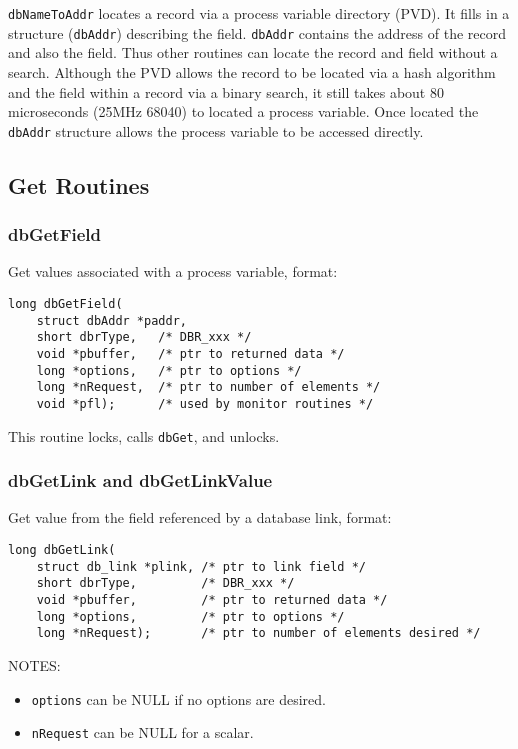 \verb|dbNameToAddr| locates a record via a process variable directory (PVD). It fills in a structure (\verb|dbAddr|) describing the 
field. \verb|dbAddr| contains the address of the record and also the field. Thus other routines can locate the record and field 
without a search. Although the PVD allows the record to be located via a hash algorithm and the field within a record via 
a binary search, it still takes about 80 microseconds (25MHz 68040) to located a process variable. Once located the 
\verb|dbAddr| structure allows the process variable to be accessed directly.

\subsection{Get Routines}

\subsubsection{dbGetField}

Get values associated with a process variable, format:

\begin{verbatim}
long dbGetField(
    struct dbAddr *paddr,
    short dbrType,   /* DBR_xxx */
    void *pbuffer,   /* ptr to returned data */
    long *options,   /* ptr to options */
    long *nRequest,  /* ptr to number of elements */
    void *pfl);      /* used by monitor routines */
\end{verbatim}

This routine locks, calls \verb|dbGet|, and unlocks.

\subsubsection{dbGetLink and dbGetLinkValue}

Get value from the field referenced by a database link, format:

\begin{verbatim}
long dbGetLink(
    struct db_link *plink, /* ptr to link field */
    short dbrType,         /* DBR_xxx */
    void *pbuffer,         /* ptr to returned data */
    long *options,         /* ptr to options */
    long *nRequest);       /* ptr to number of elements desired */
\end{verbatim}

NOTES:

\begin{itemize}

\item \verb|options| can be NULL if no options are desired.

\item \verb|nRequest| can be NULL for a scalar.

\end{itemize}

